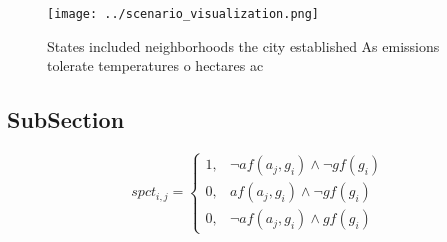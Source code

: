 \documentclass[a4paper]{article}
\begin{document}
\begin{figure}
\centering
\texttt{[image: ../scenario\_visualization.png]}
\caption{States included neighborhoods the city established As emissions tolerate temperatures o hectares ac
}
\end{figure}
 
\subsection{SubSection}

\begin{equation}
spct_{i,j} =
\begin{cases}
1, & \text{$\neg af(a_j,g_i) \wedge \neg gf(g_i)$}\\
0, & \text{$af(a_j,g_i) \wedge \neg gf(g_i)$}\\
0, & \text{$\neg af(a_j,g_i) \wedge gf(g_i)$}
\end{cases}
\end{equation}
\end{document}
